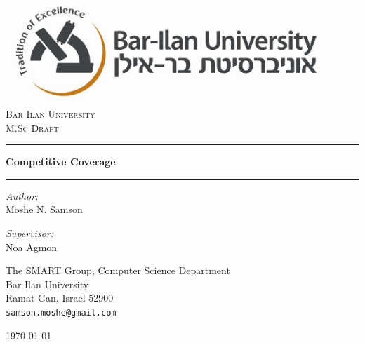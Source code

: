 \documentclass[a4paper,10pt]{article}
\begin{document}
\begin{titlepage}
\begin{center}


\includegraphics[width=0.9\textwidth]{Images/logo.jpg}\\[1cm]
\textsc{\LARGE Bar Ilan University}\\[1.5cm]
\textsc{\Large M.Sc Draft}\\[0.5cm]

\hrule
{ \vspace{2 mm} }
{ \huge \bfseries Competitive Coverage}
{ \vspace{3 mm} }
\hrule
{ \vspace{8 mm} }

\begin{minipage}{0.4\textwidth}
\begin{flushleft} \large
\emph{Author:}\\
Moshe N. Samson 

\end{flushleft}
\end{minipage}
\begin{minipage}{0.4\textwidth}
\begin{flushleft} \large
\emph{Supervisor:} \\
Noa Agmon
\end{flushleft}
\end{minipage}


\vfill


\large{The SMART Group, Computer Science Department\\
Bar Ilan University\\
Ramat Gan, Israel 52900\\
\tt\small samson.moshe@gmail.com}

\vfill

\today

\end{center}
\end{titlepage}
\end{document}
